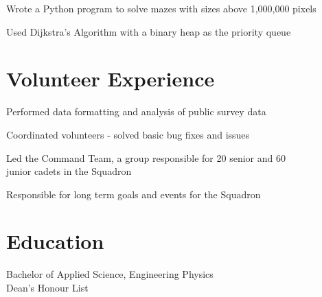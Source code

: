 \documentclass[]{deedy-resume-openfont}
\begin{document}
    \begin{tightemize}
    \item Wrote a Python program to solve mazes with sizes above 1,000,000 pixels
    \item Used Dijkstra’s Algorithm with a binary heap as the priority queue
    \end{tightemize}
    \sectionsep
    
    
    \section{Volunteer Experience}
    \begin{tightemize}
    \item Performed data formatting and analysis of public survey data
    \item Coordinated volunteers - solved basic bug fixes and issues
    \end{tightemize}
    \sectionsep
    
    \begin{tightemize}
    \item Led the Command Team, a group responsible for 20 senior and 60 \\  junior cadets in the Squadron 
    \item Responsible for long term goals and events for the Squadron
    \end{tightemize}
    \sectionsep
    
    \section{Education}
    Bachelor of Applied Science, Engineering Physics \\
    Dean's Honour List
    \sectionsep
    
\end{document}
